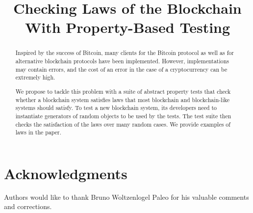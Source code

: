 \documentclass[conference]{IEEEtran}   %
\begin{document}
\title{Checking Laws of the Blockchain With Property-Based Testing}
\author{
}

\maketitle

\begin{abstract}
Inspired by the success of Bitcoin, many clients for the Bitcoin protocol as well as for alternative blockchain protocols have been implemented. However, implementations may contain errors, and the cost of an error in the case of a cryptocurrency can be extremely high. 

We propose to tackle this problem with a suite of abstract property tests that check whether a blockchain system satisfies laws that most blockchain and blockchain-like systems should satisfy. To test a new blockchain system, its developers need to instantiate generators of random objects to be used by the tests. The test suite then checks the satisfaction of the laws over many random cases. We provide examples of laws in the paper.
\end{abstract}












\section*{Acknowledgments}

Authors would like to thank Bruno Woltzenlogel Paleo for his valuable comments and corrections.





%
\end{document}

